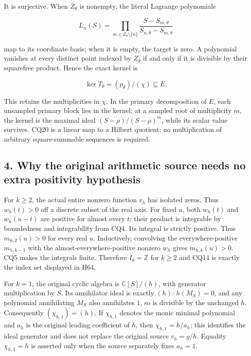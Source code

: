 It is surjective. When \(Z_\theta\) is nonempty, the literal Lagrange polynomials

\[
L_n(S)=\prod_{m\in Z_\theta\setminus\{n\}}
\frac{S-S_{m,\theta}}{S_{n,\theta}-S_{m,\theta}}
\tag{CQ21}
\]

map to its coordinate basis; when it is empty, the target is zero. A polynomial vanishes at every distinct point indexed by \(Z_\theta\) if and only if it is divisible by their squarefree product. Hence the exact kernel is

\[
\ker T_\theta=(p_\theta)/(\chi)\subseteq E.
\tag{CQ22}
\]

This retains the multiplicities in \(\chi\). In the primary decomposition of \(E\), each unsampled primary block lies in the kernel; at a sampled root of multiplicity \(m\), the kernel is the maximal ideal \((S-\rho)/(S-\rho)^m\), while its scalar value survives. CQ20 is a linear map to a Hilbert quotient; no multiplication of arbitrary square-summable sequences is required.

\subsection{4. Why the original arithmetic source needs no extra positivity hypothesis}\label{why-the-original-arithmetic-source-needs-no-extra-positivity-hypothesis}

For \(k \ge 2\), the actual entire nonzero function \(v_h\) has isolated zeros. Thus \(w_h(t)>0\) off a discrete subset of the real axis. For fixed \(u\), both \(w_h(t)\) and \(w_h(u-t)\) are positive for almost every \(t\); their product is integrable by boundedness and integrability from CQ4. Its integral is strictly positive. Thus \(m_{h,2}(u)>0\) for every real \(u\). Inductively, convolving the everywhere-positive \(m_{h,k-1}\) with the almost-everywhere-positive nonzero \(w_h\) gives \(m_{h,k}(u)>0\). CQ5 makes the integrals finite. Therefore \(I_\theta=\mathbb Z\) for \(k \ge 2\) and CQ14 is exactly the index set displayed in H64.

For \(k=1\), the original cyclic algebra is \(\mathbb C[S]/(h)\), with generator multiplication by \(S\). Its annihilator ideal is exactly \((h)\): \(h(M_S)=0\), and any polynomial annihilating \(M_S\) also annihilates \(1\), so is divisible by the unchanged \(h\). Consequently \((\chi_{h,1})=(h)\). If \(\chi_{h,1}\) denotes the monic minimal polynomial and \(a_h\) is the original leading coefficient of \(h\), then \(\chi_{h,1}=h/a_h\); this identifies the ideal generator and does not replace the original source \(v_h=g/h\). Equality \(\chi_{h,1}=h\) is asserted only when the source separately fixes \(a_h=1\).


